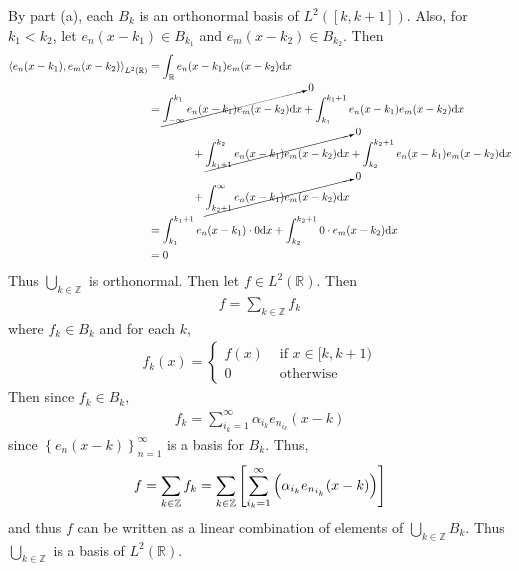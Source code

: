 \documentclass{article} %
\theoremstyle{plain}
\def\Rl{\mathbb{R}}
\newcommand{\VEC}[2]{\left\langle #1, #2 \right\rangle}
\numberwithin{equation}{section} %
\numberwithin{figure}{section} %
\numberwithin{table}{section} %
\begin{document}
\begin{enumerate}[ (a)]
        By part (a), each $B_k$ is an orthonormal basis of $L^2([k, k+1])$.  Also, for $k_1 < k_2$, let $e_n(x - k_1) \in B_{k_1}$ and $e_m(x - k_2) \in B_{k_2}$.  Then
        \begin{align*}
            \VEC{e_n(x-k_1)}{e_m(x-k_2)}_{L^2(\Rl)} &= \int_\Rl e_n(x-k_1)e_m(x-k_2)\dd x \\
            &= \cancelto{0}{\int_{-\infty}^{k_1} e_n(x-k_1)e_m(x-k_2)\dd x} + \int_{k_1}^{k_1+1} e_n(x-k_1)e_m(x-k_2)\dd x \\
            &\qquad\qquad + \cancelto{0}{\int_{k_1+1}^{k_2} e_n(x-k_1)e_m(x-k_2)\dd x} + \int_{k_2}^{k_2+1}e_n(x-k_1)e_m(x-k_2)\dd x \\
            &\qquad\qquad + \cancelto{0}{\int_{k_2+1}^\infty e_n(x-k_1)e_m(x-k_2)\dd x} \\
            &= \int_{k_1}^{k_1+1}e_n(x-k_1)\cdot 0 \dd x + \int_{k_2}^{k_2+1}0\cdot e_m(x-k_2)\dd x \\
            &= 0
        \end{align*}
        Thus $\bigcup_{k\in\mathbb{Z}}$ is orthonormal.  Then let $f \in L^2(\Rl)$.  Then
        \begin{align*}
            f = \sum_{k\in\mathbb{Z}}f_k
        \end{align*}
        where $f_k \in B_k$ and for each $k$,
        \begin{align*}
            f_k(x) = \begin{cases}
                f(x) & \text{ if } x \in [k, k+1) \\
                0 & \text{ otherwise}
            \end{cases}
        \end{align*}
        Then since $f_k \in B_k$,
        \begin{align*}
            f_k = \sum_{i_k = 1}^\infty \alpha_{i_k} e_{n_{i_k}}(x - k)
        \end{align*}
        since $\left\{e_n(x-k)\right\}_{n=1}^\infty$ is a basis for $B_k$.  Thus,
        \begin{align*}
            f = \sum_{k \in\mathbb{Z}}f_k = \sum_{k\in\mathbb{Z}}\qty[\sum_{i_k = 1}^\infty \qty(\alpha_{i_k} e_{n_{i_k}}(x-k))]
        \end{align*}
        and thus $f$ can be written as a linear combination of elements of $\bigcup_{k\in\mathbb{Z}}B_k$.  Thus $\bigcup_{k\in\mathbb{Z}}$ is a basis of $L^2(\Rl)$.
\end{enumerate}
\end{document}
